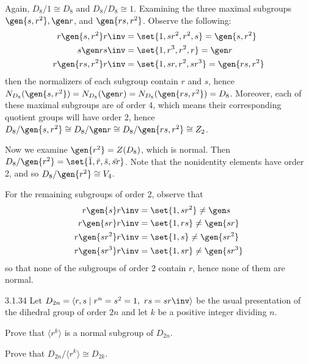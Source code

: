 \begin{sol}
    Again, $D_8/1 \cong D_8$ and $D_8/D_8 \cong 1$.
	Examining the three maximal subgroups $\gen{s, r^2}, \gen r$, and $\gen{rs, r^2}$.
	Observe the following:
    \begin{align*}
        r\gen{s, r^2}r\inv & = \set{1, sr^2, r^2, s} = \gen{s, r^2} \\
        s\gen r s\inv & = \set{1, r^3, r^2, r} = \gen r \\
        r\gen{rs, r^2}r\inv & = \set{1, sr, r^2, sr^3} = \gen{rs, r^2}
    \end{align*}
    then the normalizers of each subgroup contain $r$ and $s$, hence $N_{D_8}(\gen{s, r^2}) = N_{D_8}(\gen r) = N_{D_8}(\gen{rs, r^2}) = D_8$.
	Moreover, each of these maximal subgroups are of order 4, which means their corresponding quotient groups will have order 2, hence $D_8/\gen{s, r^2} \cong D_8/\gen r \cong D_8/\gen{rs, r^2} \cong Z_2$.

    Now we examine $\gen{r^2} = Z(D_8)$, which is normal.
	Then $D_8/\gen{r^2} = \set{\bar 1, \bar r, \bar s, \bar{sr}}$.
	Note that the nonidentity elements have order 2, and so $D_8/\gen{r^2} \cong V_4$.

    For the remaining subgroups of order 2, observe that
    \begin{align*}
        r\gen{s}r\inv & = \set{1, sr^2} \neq \gen s \\
        r\gen{sr}r\inv & = \set{1, rs} \neq \gen{sr} \\
        r\gen{sr^2}r\inv & = \set{1, s} \neq \gen{sr^2} \\
        r\gen{sr^3}r\inv & = \set{1, sr} \neq \gen{sr^3}
    \end{align*}
    so that none of the subgroups of order 2 contain $r$, hence none of them are normal.
\end{sol}

\begin{exercise}{3.1.34} 
    Let $D_{2n} = \langle r,s \mid r^n = s^2 = 1,\ rs = sr\inv  \rangle$ be the usual presentation of the dihedral group of order $2n$ and let $k$ be a positive integer dividing $n$.
    \begin{subexercises}
        \item Prove that $\langle r^k \rangle$ is a normal subgroup of $D_{2n}$.
        \item Prove that $D_{2n}/\langle r^k \rangle \cong D_{2k}$.
    \end{subexercises}
\end{exercise}

